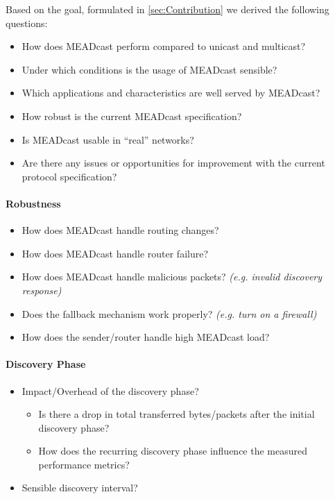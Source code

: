 
\newpage\phantom{blabla}
\newpage\phantom{blabla}
Based on the goal, formulated in \autoref{sec:Contribution} we derived the
    following questions:

\begin{itemize}
    \item How does MEADcast perform compared to unicast and multicast?
    \item Under which conditions is the usage of MEADcast sensible?
    \item Which applications and characteristics are well served by MEADcast?
    \item How robust is the current MEADcast specification?
    \item Is MEADcast usable in ``real'' networks?
    \item Are there any issues or opportunities for improvement with the
        current protocol specification?
\end{itemize}

\paragraph{Robustness} %
\label{par:Robustness}
\begin{itemize}
    \item How does MEADcast handle routing changes?
    \item How does MEADcast handle router failure?
    \item How does MEADcast handle malicious packets?
        \textit{(e.g. invalid discovery response)}
    \item Does the fallback mechanism work properly?
        \textit{(e.g. turn on a firewall)}
    \item How does the sender/router handle high MEADcast load?
\end{itemize}

\paragraph{Discovery Phase} %
\label{par:Discovery Phase}
\begin{itemize}
    \item Impact/Overhead of the discovery phase?
    \begin{itemize}
        \item Is there a drop in total transferred bytes/packets after the
            initial discovery phase?
        \item How does the recurring discovery phase influence the measured
            performance metrics?
    \end{itemize}
    \item Sensible discovery interval?
\end{itemize}

